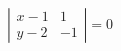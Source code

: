 \begin{displaymath}
\left \vert
\begin{array}{ll}
 x-1 & 1 \\ 
y-2 & -1
\end{array}
\right \vert =0
\end{displaymath}
